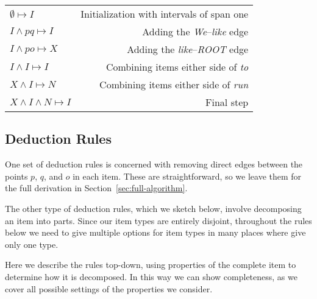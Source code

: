 \begin{center}
\begin{tabular}{lr}
  $\emptyset \mapsto I$ & Initialization with intervals of span one \\
  $I \land pq \mapsto I$ & Adding the \emph{We}--\emph{like} edge\\
  $I \land po \mapsto X$ & Adding the \emph{like}--\emph{ROOT} edge \\
  $I \land I \mapsto I$ & Combining items either side of \emph{to} \\
  $X \land I \mapsto N$ & Combining items either side of \emph{run} \\
  $X \land I \land N \mapsto I$ & Final step \\
\end{tabular}
\end{center}

\subsection{Deduction Rules}
One set of deduction rules is concerned with removing direct edges between the points $p$, $q$, and $o$ in each item.
These are straightforward, so we leave them for the full derivation in Section~\ref{sec:full-algorithm}.

The other type of deduction rules, which we sketch below, involve decomposing an item into parts.
Since our item types are entirely disjoint, throughout the rules below we need to give multiple options for item types in many places where \textcite{ec} give only one type.

Here we describe the rules top-down, using properties of the complete item to determine how it is decomposed.
In this way we can show completeness, as we cover all possible settings of the properties we consider.

